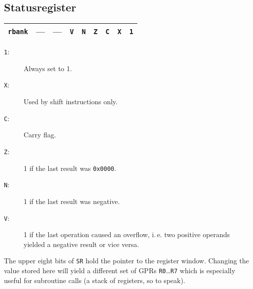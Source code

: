 \documentclass{leaflet}
\begin{document}
  \subsection{Statusregister}
   \begin{center}
    \begin{longtable}{|c||c|c|c|c|c|c|c|c|}
     \hline
     {\tt rbank}&
     ---&---&{\tt V}&{\tt N}&{\tt Z}&{\tt C}&{\tt X}&{\tt 1}\\
     \hline
    \end{longtable}
    \vspace*{-9mm}
   \end{center}
   \begin{description}
    \item [{\tt 1}:] Always set to 1.
    \item [{\tt X}:] Used by shift instructions only.
    \item [{\tt C}:] Carry flag.
    \item [{\tt Z}:] 1 if the last result was {\tt 0x0000}.
    \item [{\tt N}:] 1 if the last result was negative.
    \item [{\tt V}:] 1 if the last operation caused an overflow, i.\,e. two
     positive operands yielded a negative result or vice versa.
   \end{description}
   The upper eight bits of \texttt{SR} hold the pointer to the register
   window. Changing the value stored here will yield a different set of 
   GPRs \texttt{R0}\dots\texttt{R7} which is especially useful for subroutine
   calls (a stack of registers, so to speak).
   \vspace*{-5mm}
%
\end{document}

